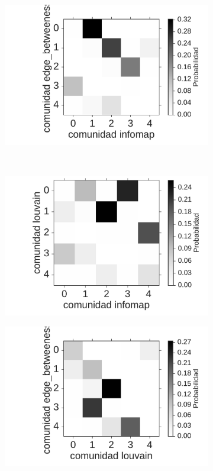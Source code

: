 {\begin{figure}[!ht]
\begin{subfigure}[b]{.45\columnwidth}
    \end{subfigure}
    \begin{subfigure}[b]{.45\columnwidth}
        \includegraphics[width=0.95\columnwidth]{figuras/join_proba_infomap-edge_betweeness.pdf}
    \end{subfigure}\\
    \begin{subfigure}[b]{.45\columnwidth}
        \includegraphics[width=0.95\columnwidth]{figuras/join_proba_infomap-louvain.pdf}
    \end{subfigure}
    \begin{subfigure}[b]{.45\columnwidth}
        \includegraphics[width=0.95\columnwidth]{figuras/join_proba_louvain-edge_betweeness.pdf}

\end{subfigure}
\end{figure}}
